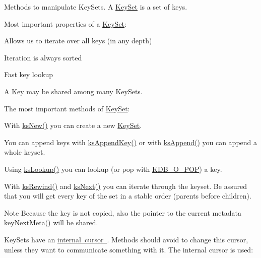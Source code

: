 Methods to manipulate Key\+Sets. A \mbox{\hyperlink{classkdb_1_1KeySet}{Key\+Set}} is a set of keys.

Most important properties of a \mbox{\hyperlink{classkdb_1_1KeySet}{Key\+Set}}\+:


\begin{DoxyItemize}
\item Allows us to iterate over all keys (in any depth)
\item Iteration is always sorted
\item Fast key lookup
\item A \mbox{\hyperlink{classkdb_1_1Key}{Key}} may be shared among many Key\+Sets.
\end{DoxyItemize}

The most important methods of \mbox{\hyperlink{classkdb_1_1KeySet}{Key\+Set}}\+:


\begin{DoxyItemize}
\item With \mbox{\hyperlink{group__keyset_ga671e1aaee3ae9dc13b4834a4ddbd2c3c}{ks\+New()}} you can create a new \mbox{\hyperlink{classkdb_1_1KeySet}{Key\+Set}}.
\item You can append keys with \mbox{\hyperlink{group__keyset_gaa5a1d467a4d71041edce68ea7748ce45}{ks\+Append\+Key()}} or with \mbox{\hyperlink{group__keyset_ga21eb9c3a14a604ee3a8bdc779232e7b7}{ks\+Append()}} you can append a whole keyset.
\item Using \mbox{\hyperlink{group__keyset_gaa34fc43a081e6b01e4120daa6c112004}{ks\+Lookup()}} you can lookup (or pop with \mbox{\hyperlink{group__keyset_gga98a3d6a4016c9dad9cbd1a99a9c2a45aa52fb5f2cc86773d393da62bebebf7984}{K\+D\+B\+\_\+\+O\+\_\+\+P\+OP}}) a key.
\item With \mbox{\hyperlink{group__keyset_gabe793ff51f1728e3429c84a8a9086b70}{ks\+Rewind()}} and \mbox{\hyperlink{group__keyset_ga317321c9065b5a4b3e33fe1c399bcec9}{ks\+Next()}} you can iterate through the keyset. Be assured that you will get every key of the set in a stable order (parents before children).
\end{DoxyItemize}

\begin{DoxyNote}{Note}
Because the key is not copied, also the pointer to the current metadata \mbox{\hyperlink{group__keymeta_ga4c88342f580a4291455a801af71ce048}{key\+Next\+Meta()}} will be shared.
\end{DoxyNote}
Key\+Sets have an \mbox{\hyperlink{group__keyset_ga4287b9416912c5f2ab9c195cb74fb094}{internal cursor }}. Methods should avoid to change this cursor, unless they want to communicate something with it. The internal cursor is used\+:


